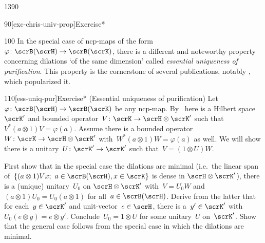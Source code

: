\begin{parsec}{1390}
\begin{point}{90}[exc-chris-univ-prop]{Exercise*}
\spacingfix{}
\begin{point}{100}%
In the special case of ncp-maps
    of the form~$\varphi \colon \scrB(\scrH) \to \scrB(\scrK)$,
    there is a different and noteworthy  property
    concerning dilations `of the same dimension'
    called \emph{essential uniqueness of purification}.
This property is the cornerstone of several publications,
    notably \cite{chiribella}, which popularized it.
\end{point}
\end{point}
\begin{point}{110}[ess-uniq-pur]{Exercise* (Essential uniqueness of purification)}
    Let~$\varphi \colon \scrB(\scrH) \to \scrB(\scrK)$
        be any ncp-map.
    By~
    here is a Hilbert space~$\scrK'$
        and bounded operator~$V\colon \scrK \to \scrH \otimes \scrK'$
        such that~$V^* (a\otimes 1) V = \varphi(a)$.
        Assume there is a bounded
            operator~$W\colon \scrK \to \scrH \otimes \scrK'$
        with~$W^* (a \otimes 1) W = \varphi(a)$ as well.
    We will show there is a unitary~$U \colon \scrK' \to \scrK'$
    such that~$V = (1 \otimes U) W$.

    First show that in the special case the dilations are minimal
    (i.e.~the linear span of~$\{(a \otimes 1) V x;\  a \in \scrB(\scrH), x \in \scrK\}$ is dense
            in $\scrH \otimes \scrK'$),
        there is a (unique) unitary~$U_0$ on $\scrH \otimes \scrK'$
        with~$V = U_0 W$ and~$(a \otimes 1) U_0 = U_0 (a \otimes 1)$
            for all~$a \in \scrB(\scrH)$.
    Derive from the latter
    that for each~$y \in \scrK'$ and unit-vector~$e \in \scrH$,
        there is a~$y' \in \scrK'$
        with~$U_0 (e \otimes y) = e \otimes y'$.
    Conclude~$U_0 = 1 \otimes U$ for some unitary~$U$ on~$\scrK'$.
    Show  that the general case follows from the special case
        in which the dilations are minimal.
\end{point}
\end{parsec}
